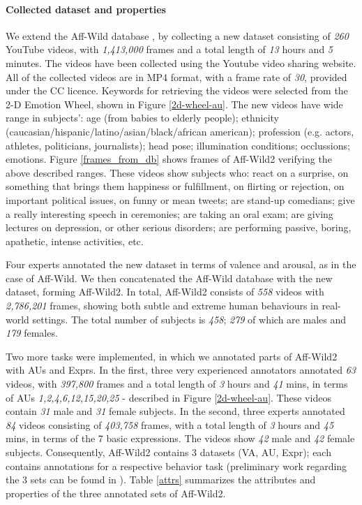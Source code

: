 \documentclass{bmvc2k}
\begin{document}
\paragraph{Collected dataset and properties}
We extend the Aff-Wild database \cite{kollias2019deep,zafeiriou2017aff}, by collecting a new dataset consisting of \textit{260} YouTube videos, with \textit{1,413,000} 
frames and a total length of \textit{13} hours and \textit{5} minutes. 
The videos have been collected using the Youtube video sharing website. All of the collected videos are in MP4 format, with a frame rate of \textit{30}, provided under the CC licence. Keywords for retrieving the videos were selected from the 2-D Emotion Wheel, shown in Figure \ref{2d-wheel-au}.
The new videos have wide range in subjects': age (from babies to elderly people); ethnicity (caucasian/hispanic/latino/asian/black/african american); profession (e.g. actors, athletes, politicians, journalists); head pose; illumination conditions; occlussions; emotions. Figure \ref{frames_from_db} shows frames of Aff-Wild2 verifying the above described ranges.
These videos show subjects who: react on a surprise, on something that brings them happiness or fulfillment, on flirting or rejection, on important political issues, on funny or mean tweets; are stand-up comedians; give a really interesting speech in ceremonies; are taking an oral exam; are giving lectures on depression, or other serious disorders; are performing passive, boring, apathetic, intense activities,  etc.

Four experts annotated the new dataset in terms of valence and arousal, as in the case of Aff-Wild. 
We then concatenated the Aff-Wild database with the new dataset, forming Aff-Wild2. In total, Aff-Wild2 consists of \textit{558} videos with \textit{2,786,201} frames, showing both subtle and extreme human behaviours in real-world settings. The total number of subjects is \textit{458}; \textit{279} of which are males and \textit{179} females.   


Two more tasks were implemented, in which we annotated parts of Aff-Wild2 with AUs and Exprs. 
In the first, three very experienced annotators annotated \textit{63} videos, with \textit{397,800}  frames and a total length of \textit{3} hours and \textit{41} mins, in terms of AUs \textit{1,2,4,6,12,15,20,25} - described in Figure \ref{2d-wheel-au}. These videos contain \textit{31} male and \textit{31} female subjects.
In the second, three experts annotated \textit{84} videos consisting of \textit{403,758} frames,  with a total length of \textit{3} hours and \textit{45} mins, in terms of the 7 basic expressions. The videos  show \textit{42}  male  and  \textit{42}  female subjects. 
Consequently, Aff-Wild2 contains 3 datasets (VA, AU, Expr); each contains annotations for a respective behavior task (preliminary work regarding the 3 sets can be found in \cite{kollias2018fg,kollias2018multi}).  Table \ref{attrs} summarizes the attributes and properties of the three annotated sets of Aff-Wild2. 
\end{document}
